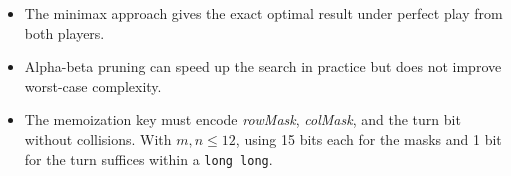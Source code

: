 \documentclass[11pt,a4paper]{article}
\begin{document}
\begin{itemize}
  \item The minimax approach gives the exact optimal result under perfect
    play from both players.
  \item Alpha-beta pruning can speed up the search in practice but does not
    improve worst-case complexity.
  \item The memoization key must encode \textit{rowMask}, \textit{colMask},
    and the turn bit without collisions. With $m, n \le 12$, using 15 bits
    each for the masks and 1 bit for the turn suffices within a
    \texttt{long long}.
\end{itemize}
\end{document}
